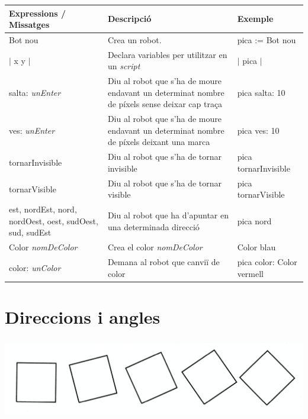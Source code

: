 \noindent
\setlength{\extrarowheight}{1mm}
{\small \begin{tabular}{p{50mm}p{50mm}p{40mm}}
\hline
\textbf{Expressions / Missatges}
&
\textbf{Descripció}
&
\textbf{Exemple}
\\
\hline
\textsf{Bot nou}
&
Crea un robot.
&
\textsf{pica := Bot nou}
\\
\textsf{$|$ x y $|$}
&
Declara variables per utilitzar en un \emph{script}
&
\textsf{$|$ pica $|$}
\\
\textsf{salta: {\itshape unEnter}}
&
Diu al robot que s'ha de moure endavant un determinat nombre de píxels sense deixar cap traça
&
\textsf{pica salta: 10}
\\
\textsf{ves: {\itshape unEnter}}
&
Diu al robot que s'ha de moure endavant un determinat nombre de píxels deixant una marca
&
\textsf{pica ves: 10}
\\
\textsf{tornarInvisible}
&
Diu al robot que s'ha de tornar invisible
&
\textsf{pica tornarInvisible}
\\
\textsf{tornarVisible}
&
Diu al robot que s'ha de tornar visible
&
\textsf{pica tornarVisible}
\\
\textsf{est, nordEst, nord, nordOest, oest, sudOest, sud, sudEst}
&
Diu al robot que ha d'apuntar en una determinada direcció
&
\textsf{pica nord}
\\
\textsf{Color {\itshape nomDeColor}}
&
Crea el color \textit{nomDeColor}
&
\textsf{Color blau}
\\
\textsf{color: {\itshape unColor}}
&
Demana al robot que canviï de color
&
\textsf{pica color: Color vermell}
\\
\hline
\end{tabular}}


\chapter{Direccions i angles}
\label{cap4}

\begin{center}
\includegraphics[height=35mm ,width=\textwidth ]{Imatges/figura4-0.jpg}
\end{center}

